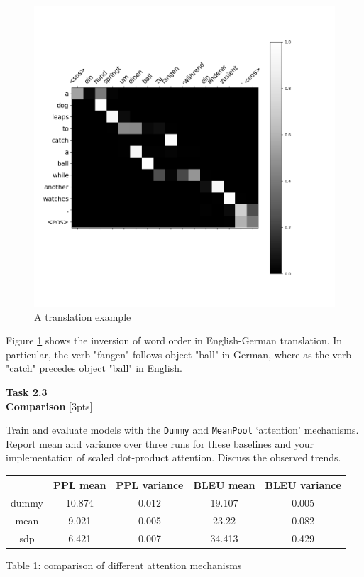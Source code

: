 \documentclass[12pt,article]{article}
\newenvironment{task}[2][Task]
    { \begin{mdframed}[backgroundcolor=gray!20] \textbf{#1 #2} \\}
    {  \end{mdframed}}
\begin{document}
\begin{figure}[H]
    \centering
    \includegraphics[scale=0.5]{281_translation.png} \par
    \caption{A translation example}
    \label{fig:trans-ex}
\end{figure}

Figure \ref{fig:trans-ex} shows the inversion of word order in English-German translation. In particular, the verb "fangen" follows object "ball" in German, where as the verb "catch" precedes object "ball" in English.

\newpage
\begin{task}{2.3} 
\textbf{Comparison} [3pts]

Train and evaluate models with the \texttt{Dummy} and \texttt{MeanPool} `attention' mechanisms. Report mean and variance over three runs for these baselines and your implementation of scaled dot-product attention. Discuss the observed trends.
\end{task}

\begin{center}
    \begin{tabular}{ |c|c|c|c|c| } 
    \hline
    & PPL mean & PPL variance & BLEU mean & BLEU variance \\
    \hline
    dummy & 10.874 & 0.012 & 19.107 & 0.005 \\
    \hline
    mean & 9.021 & 0.005 & 23.22 & 0.082 \\
    \hline
    sdp & 6.421 & 0.007 & 34.413 & 0.429 \\
    \hline
    \end{tabular}
    
    Table 1: comparison of different attention mechanisms
\end{center}
\end{document}
